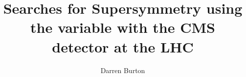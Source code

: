 \documentclass{mythesis}
\title{\LARGE{Searches for Supersymmetry using the \alphat variable with the CMS detector at the LHC}}
\author{Darren Burton \vspace*{0.5cm}}
\begin{document}
\runninglinenumbers

\begin{frontmatter}
  
\end{frontmatter}

\begin{mainmatter}
  
  
  
  
  
  
  
\end{mainmatter}

\begin{appendices}
  
\end{appendices}

\begin{backmatter}
  
\end{backmatter}

\end{document}
